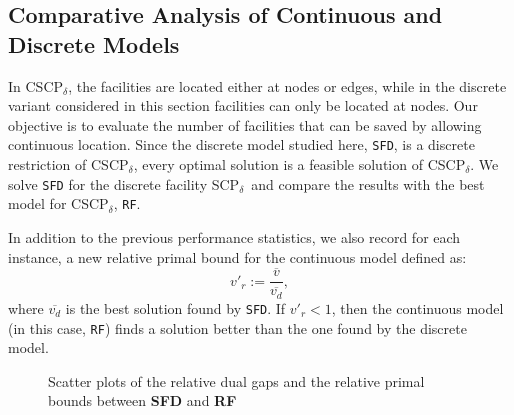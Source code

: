 \documentclass[review]{elsarticle}
\newcommand{\dlt}{{\delta}}
\newcommand{\problem}{CSCP$_\dlt$}
\newcommand{\dfproblem}{discrete facility SCP$_\dlt$}
\theoremstyle{definition}
\begin{document}
\subsection{Comparative Analysis of Continuous and Discrete Models}

 In  \problem, the facilities are located either at nodes or edges, while in the discrete variant considered in this section facilities can only be located at nodes.
Our objective is to evaluate the number of facilities that can be saved by allowing continuous location. Since the discrete model studied here, \texttt{SFD}, is a discrete restriction of \problem,  every optimal solution is a feasible solution of \problem.
 We solve \texttt{SFD} for the \dfproblem \,  and compare the results with the best model for \problem, \texttt{RF}.


In addition to the previous performance statistics, we also record for each instance, a new relative primal bound for the continuous model defined as:
$$v'_r := \frac{\overline{v}}{\overline{v_d}},$$ where $\overline{v_d}$ is the best solution found by \texttt{SFD}.  If $v'_r < 1$, then the continuous model (in this case, \texttt{RF}) finds a solution better than the one found by the discrete model.



 \begin{figure}[htbp]
\caption{Scatter plots of the relative dual gaps and the relative primal bounds between \textbf{SFD} and \textbf{RF}}
\label{fig.scatter2}
\end{figure}
\end{document}
